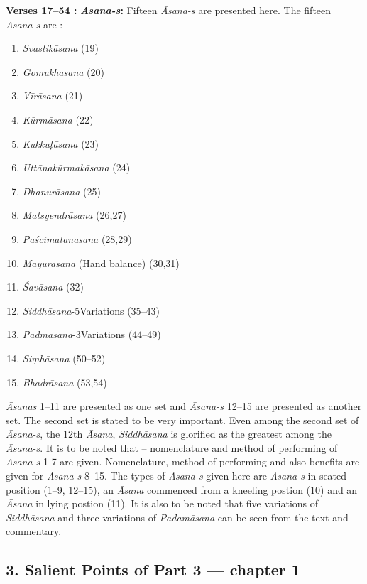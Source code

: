 \textbf{Verses  17--54 :} \textbf{\textit{Āsana-s}:} Fifteen \textit{Āsana-s} are presented here. The fifteen \textit{Āsana-s} are :

\begin{multicols}{2}
\begin{enumerate}
\itemsep=0pt
\item \textit{Svastikāsana} (19)
\item \textit{Gomukhāsana} (20)
\item \textit{Vīrāsana}  (21)
\item \textit{Kūrmāsana} (22)
\item \textit{Kukkuṭāsana} (23)
\item \textit{Uttānakūrmakāsana} (24)
\item \textit{Dhanurāsana} (25)
\item \textit{Matsyendrāsana} (26,27) 
\item \textit{Paścimatānāsana} (28,29)
\item \textit{Mayūrāsana} (Hand balance) (30,31) 
\item \textit{Śavāsana} (32) 
\item \textit{Siddhāsana}-5\hfil\break Variations  (35--43) 
\item \textit{Padmāsana}-3\hfil\break Variations (44--49)
\item \textit{Siṃhāsana} (50--52)   
\item \textit{Bhadrāsana}  (53,54)
\end{enumerate}
\end{multicols}

\textit{Āsanas} 1--11 are presented as one set and \textit{Āsana-s} 12--15 are presented as another set. The second set is stated to be very important. Even among the second set of \textit{Āsana-s}, the 12th \textit{Āsana}, \textit{Siddhāsana} is glorified as the greatest among the \textit{Āsana-s}. It is to be noted that – nomenclature and method of performing of \textit{Āsana-s} 1-7 are given. Nomenclature, method of performing and also benefits are given for \textit{Āsana-s} 8--15.  The types of \textit{Āsana-s} given here are \textit{Āsana-s} in seated position (1--9, 12--15), an \textit{Āsana}  commenced from a kneeling postion (10) and an \textit{Āsana} in lying postion (11). It is also to be noted that five variations of \textit{Siddhāsana} and three variations of \textit{Padamāsana} can be seen from the text and commentary.

\subsection*{3. Salient Points  of Part 3  --- chapter 1}

